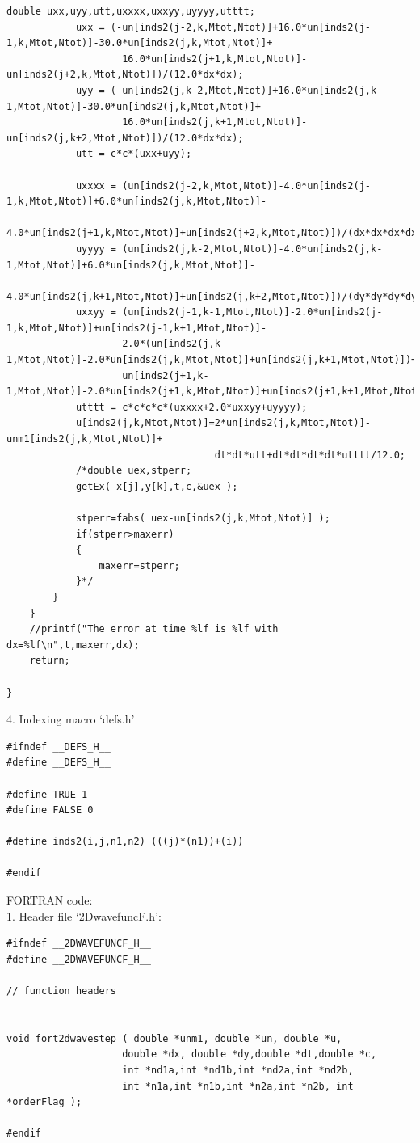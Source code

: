 \begin{lstlisting}[frame=single]
			double uxx,uyy,utt,uxxxx,uxxyy,uyyyy,utttt;
			uxx = (-un[inds2(j-2,k,Mtot,Ntot)]+16.0*un[inds2(j-1,k,Mtot,Ntot)]-30.0*un[inds2(j,k,Mtot,Ntot)]+
					16.0*un[inds2(j+1,k,Mtot,Ntot)]-un[inds2(j+2,k,Mtot,Ntot)])/(12.0*dx*dx);
			uyy = (-un[inds2(j,k-2,Mtot,Ntot)]+16.0*un[inds2(j,k-1,Mtot,Ntot)]-30.0*un[inds2(j,k,Mtot,Ntot)]+
					16.0*un[inds2(j,k+1,Mtot,Ntot)]-un[inds2(j,k+2,Mtot,Ntot)])/(12.0*dx*dx);
			utt = c*c*(uxx+uyy);
			
			uxxxx = (un[inds2(j-2,k,Mtot,Ntot)]-4.0*un[inds2(j-1,k,Mtot,Ntot)]+6.0*un[inds2(j,k,Mtot,Ntot)]-
					4.0*un[inds2(j+1,k,Mtot,Ntot)]+un[inds2(j+2,k,Mtot,Ntot)])/(dx*dx*dx*dx);
			uyyyy = (un[inds2(j,k-2,Mtot,Ntot)]-4.0*un[inds2(j,k-1,Mtot,Ntot)]+6.0*un[inds2(j,k,Mtot,Ntot)]-
					4.0*un[inds2(j,k+1,Mtot,Ntot)]+un[inds2(j,k+2,Mtot,Ntot)])/(dy*dy*dy*dy);
			uxxyy = (un[inds2(j-1,k-1,Mtot,Ntot)]-2.0*un[inds2(j-1,k,Mtot,Ntot)]+un[inds2(j-1,k+1,Mtot,Ntot)]-
					2.0*(un[inds2(j,k-1,Mtot,Ntot)]-2.0*un[inds2(j,k,Mtot,Ntot)]+un[inds2(j,k+1,Mtot,Ntot)])+
					un[inds2(j+1,k-1,Mtot,Ntot)]-2.0*un[inds2(j+1,k,Mtot,Ntot)]+un[inds2(j+1,k+1,Mtot,Ntot)])/(dx*dx*dy*dy);
			utttt = c*c*c*c*(uxxxx+2.0*uxxyy+uyyyy);
			u[inds2(j,k,Mtot,Ntot)]=2*un[inds2(j,k,Mtot,Ntot)]-unm1[inds2(j,k,Mtot,Ntot)]+
									dt*dt*utt+dt*dt*dt*dt*utttt/12.0;
			/*double uex,stperr;
			getEx( x[j],y[k],t,c,&uex );
				
			stperr=fabs( uex-un[inds2(j,k,Mtot,Ntot)] );
			if(stperr>maxerr)
			{
				maxerr=stperr;
			}*/
		}
	}
	//printf("The error at time %lf is %lf with dx=%lf\n",t,maxerr,dx);
	return;

}
\end{lstlisting}
4. Indexing macro `defs.h'
\begin{lstlisting}[frame=single]
#ifndef __DEFS_H__
#define __DEFS_H__

#define TRUE 1
#define FALSE 0

#define inds2(i,j,n1,n2) (((j)*(n1))+(i))

#endif
\end{lstlisting}
\lstset{language=Fortran}
FORTRAN code:\\
1. Header file `2DwavefuncF.h':
\begin{lstlisting}[frame=single]
#ifndef __2DWAVEFUNCF_H__
#define __2DWAVEFUNCF_H__

// function headers


void fort2dwavestep_( double *unm1, double *un, double *u,
					double *dx, double *dy,double *dt,double *c,
					int *nd1a,int *nd1b,int *nd2a,int *nd2b,
					int *n1a,int *n1b,int *n2a,int *n2b, int *orderFlag );
					
#endif
\end{lstlisting}

